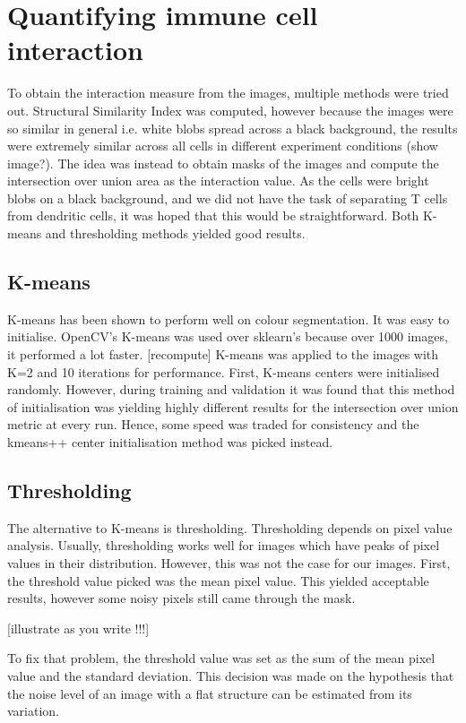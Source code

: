 \section{Quantifying immune cell interaction}

To obtain the interaction measure from the images, multiple methods were tried out. Structural Similarity Index was computed, however because the images were so similar in general i.e. white blobs spread across a black background, the results were extremely similar across all cells in different experiment conditions (show image?). The idea was instead to obtain masks of the images and compute the intersection over union area as the interaction value. As the cells were bright blobs on a black background, and we did not have the task of separating T cells from dendritic cells, it was hoped that this would be straightforward. Both K-means and thresholding methods yielded good results.

\subsection{K-means}
K-means has been shown to perform well on colour segmentation. It was easy to initialise. OpenCV's K-means was used over sklearn's because over 1000 images, it performed a lot faster. [recompute] K-means was applied to the images with K=2 and 10 iterations for performance. First, K-means centers were initialised randomly. However, during training and validation it was found that this method of initialisation was yielding highly different results for the intersection over union metric at every run. Hence, some speed was traded for consistency and the kmeans++ center initialisation method was picked instead. 

\subsection{Thresholding}
The alternative to K-means is thresholding. Thresholding depends on pixel value analysis. Usually, thresholding works well for images which have peaks of pixel values in their distribution. However, this was not the case for our images. First, the threshold value picked was the mean pixel value. This yielded acceptable results, however some noisy pixels still came through the mask. 

[illustrate as you write !!!]

To fix that problem, the threshold value was set as the sum of the mean pixel value and the standard deviation. This decision was made on the hypothesis that the noise level of an image with a flat structure can be estimated from its variation.

